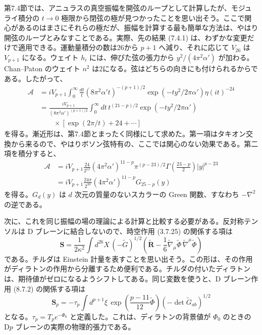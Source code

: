 第7.4節では、アニュラスの真空振幅を開弦のループとして計算したが、モジュライ積分の $t\to0$ 極限から閉弦の極が見つかったことを思い出そう。ここで関心があるのはまさにそれらの極だが、振幅を計算する最も簡単な方法は、やはり開弦のループとみなすことである。実際、先の結果 (7.4.1) は、わずかな変更だけで適用できる。運動量積分の数は26から $p+1$ へ減り、それに応じて $V_{26}$ は $V_{p+1}$ になる。ウェイト $h_i$ には、伸びた弦の張力から $y^2/(4\pi^2\alpha')$ が加わる。Chan--Paton のウェイト $n^2$ は2になる。弦はどちらの向きにも付けられるからである。したがって、
\begin{equation}
\begin{split}
\mathcal A
&=iV_{p+1}\int_0^\infty\frac{dt}{t}
(8\pi^2\alpha't)^{-(p+1)/2}
\exp(-ty^2/2\pi\alpha')\eta(it)^{-24}\\
&=\frac{iV_{p+1}}{(8\pi^2\alpha')^{(p+1)/2}}
\int_0^\infty dt\,t^{(21-p)/2}\exp(-ty^2/2\pi\alpha')\\
&\qquad\times\left[\exp(2\pi/t)+24+\cdots\right]
\end{split}
\tag{8.7.17}\label{eq:8.7.17}
\end{equation}
を得る。漸近形は、第7.4節とまったく同様にして求めた。第一項はタキオン交換から来るので、やはりボソン弦特有の、ここでは関心のない効果である。第二項を積分すると、
\begin{equation}
\begin{split}
\mathcal A
&=iV_{p+1}\frac{24}{2^{12}}(4\pi^2\alpha')^{11-p}
\pi^{(p-23)/2}\Gamma\left(\frac{23-p}{2}\right)|y|^{p-23}\\
&=iV_{p+1}\frac{24\pi}{2^{10}}(4\pi^2\alpha')^{11-p}G_{25-p}(y)
\end{split}
\tag{8.7.18}\label{eq:8.7.18}
\end{equation}
を得る。$G_d(y)$ は $d$ 次元の質量のないスカラーの Green 関数、すなわち $-\nabla^2$ の逆である。

次に、これを同じ振幅の場の理論による計算と比較する必要がある。反対称テンソルは D ブレーンに結合しないので、時空作用 (3.7.25) の関係する項は
\begin{equation}
\boldsymbol S=\frac1{2\kappa^2}\int d^{26}X\,(-\widetilde G)^{1/2}
\left(\widetilde{\boldsymbol R}
-\frac16\widetilde\nabla_\mu\widetilde\Phi\,
\widetilde\nabla^\mu\widetilde\Phi\right)
\tag{8.7.19}\label{eq:8.7.19}
\end{equation}
である。チルダは Einstein 計量を表すことを思い出そう。この形は、その作用がディラトンの作用から分離するため便利である。チルダの付いたディラトンは、期待値がゼロになるようシフトしてある。同じ変数を使うと、D ブレーン作用 (8.7.2) の関係する項は
\begin{equation}
\boldsymbol S_p=-\tau_p\int d^{p+1}\xi\,
\exp\left(\frac{p-11}{12}\widetilde\Phi\right)
(-\det\widetilde G_{ab})^{1/2}
\tag{8.7.20}\label{eq:8.7.20}
\end{equation}
となる。$\tau_p=T_pe^{-\Phi_0}$ と定義した。これは、ディラトンの背景値が $\Phi_0$ のときの D$p$ ブレーンの実際の物理的張力である。

